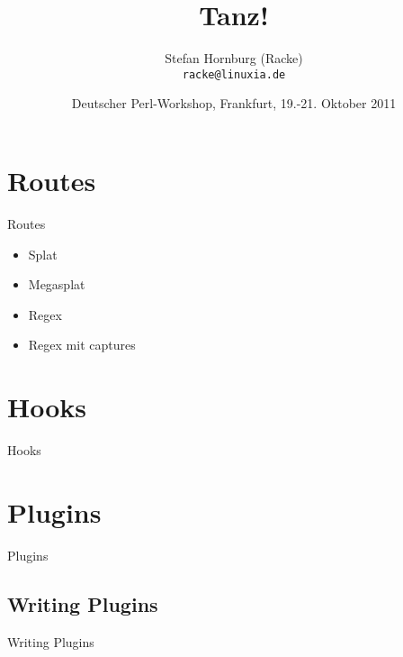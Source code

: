 \usepackage[T1]{fontenc}
\usepackage{mathptmx}
\usepackage[scaled=.90]{helvet}
\usepackage{courier}

\usepackage{beamerthemesplit}
\usepackage{verbatim}
\usepackage{hyperref}
\usepackage{listings}
\lstset{language=Perl,basicstyle=\footnotesize,tabsize=3,showstringspaces=false}

\title{Tanz!}
\author[racke]{Stefan Hornburg (Racke)\\ \texttt{racke@linuxia.de}}
\date[GPW2011]{Deutscher Perl-Workshop, Frankfurt, 19.-21. Oktober 2011}



\maketitle{}

\begin{frame}
  \titlepage
\end{frame}

\tableofcontents

\section{Routes}
\begin{frame}{Routes}
\begin{itemize}
\item Splat
\item Megasplat
\item Regex
\item Regex mit captures
\end{itemize}
\end{frame}

\section{Hooks}
\begin{frame}{Hooks}
\end{frame}

\section{Plugins}
\begin{frame}{Plugins}
\end{frame}

\subsection{Writing Plugins}
\begin{frame}{Writing Plugins}
\end{frame}

